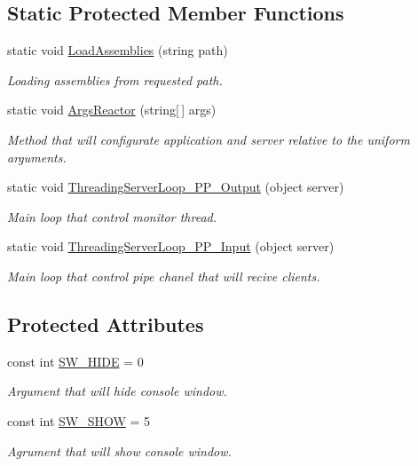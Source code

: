 \subsection*{Static Protected Member Functions}
\begin{DoxyCompactItemize}
\item 
static void \mbox{\hyperlink{class_uniform_server_1_1_base_server_a22b92ad517cd1003fe4fe3c86d857169}{Load\+Assemblies}} (string path)
\begin{DoxyCompactList}\small\item\em Loading assemblies from requested path. \end{DoxyCompactList}\item 
static void \mbox{\hyperlink{class_uniform_server_1_1_base_server_a992660752da60019c348e18226a87bf2}{Args\+Reactor}} (string\mbox{[}$\,$\mbox{]} args)
\begin{DoxyCompactList}\small\item\em Method that will configurate application and server relative to the uniform arguments. \end{DoxyCompactList}\item 
static void \mbox{\hyperlink{class_uniform_server_1_1_base_server_a8e9e872bad891b2bc06a8caa6c09ebf9}{Threading\+Server\+Loop\+\_\+\+P\+P\+\_\+\+Output}} (object server)
\begin{DoxyCompactList}\small\item\em Main loop that control monitor thread. \end{DoxyCompactList}\item 
static void \mbox{\hyperlink{class_uniform_server_1_1_base_server_a6cf6b8472de3925d465737a7fc9a8842}{Threading\+Server\+Loop\+\_\+\+P\+P\+\_\+\+Input}} (object server)
\begin{DoxyCompactList}\small\item\em Main loop that control pipe chanel that will recive clients. \end{DoxyCompactList}\end{DoxyCompactItemize}
\subsection*{Protected Attributes}
\begin{DoxyCompactItemize}
\item 
const int \mbox{\hyperlink{class_uniform_server_1_1_base_server_aaff91507b262d2a1b9021caa2d01640f}{S\+W\+\_\+\+H\+I\+DE}} = 0
\begin{DoxyCompactList}\small\item\em Argument that will hide console window. \end{DoxyCompactList}\item 
const int \mbox{\hyperlink{class_uniform_server_1_1_base_server_a494087cabc03c54c3dc0ac1cc1048860}{S\+W\+\_\+\+S\+H\+OW}} = 5
\begin{DoxyCompactList}\small\item\em Agrument that will show console window. \end{DoxyCompactList}\end{DoxyCompactItemize}

